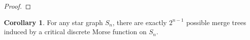 \documentclass{article}
\theoremstyle{definition}
\newcommand{\ep}    {\epsilon}
\newtheorem{cor}[thm]   {Corollary}
\begin{document}
\begin{proof}
\end{proof}



\begin{cor}
For any star graph $S_n$, there are exactly $2^{n-1}$ possible merge trees induced by a critical discrete Morse function on $S_n$.
\end{cor}
\end{document}
